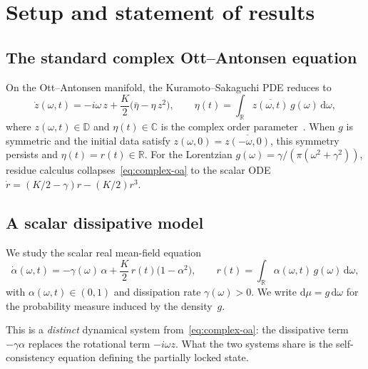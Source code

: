 \documentclass[11pt,a4paper]{article}
\theoremstyle{definition}
\newcommand{\D}{\mathbb{D}}
\newcommand{\R}{\mathbb{R}}
\newcommand{\C}{\mathbb{C}}
\begin{document}
\tableofcontents

\section{Setup and statement of results}\label{sec:setup}

\subsection{The standard complex Ott--Antonsen equation}\label{sec:complex-oa}

On the Ott--Antonsen manifold, the Kuramoto--Sakaguchi PDE reduces to
\begin{equation}\label{eq:complex-oa}
\dot{z}(\omega,t) = -i\omega\,z + \frac{K}{2}\bigl(\bar\eta - \eta\,z^2\bigr), \qquad \eta(t) = \int_\R \overline{z(\omega,t)}\,g(\omega)\,\mathrm{d}\omega,
\end{equation}
where $z(\omega,t)\in\D$ and $\eta(t)\in\C$ is the complex order parameter~\cite{ott-antonsen2008}. When $g$ is symmetric and the initial data satisfy $z(\omega,0) = \overline{z(-\omega,0)}$, this symmetry persists and $\eta(t) = r(t)\in\R$. For the Lorentzian $g(\omega) = \gamma/(\pi(\omega^2+\gamma^2))$, residue calculus collapses~\eqref{eq:complex-oa} to the scalar ODE $\dot r = (K/2-\gamma)r - (K/2)r^3$.

\subsection{A scalar dissipative model}\label{sec:scalar-model}

We study the scalar real mean-field equation
\begin{equation}\label{eq:oa}
\dot{\alpha}(\omega,t) = -\gamma(\omega)\,\alpha + \frac{K}{2}\,r(t)\bigl(1 - \alpha^2\bigr), \qquad r(t) = \int_\R \alpha(\omega,t)\,g(\omega)\,\mathrm{d}\omega,
\end{equation}
with $\alpha(\omega,t)\in(0,1)$ and dissipation rate $\gamma(\omega)>0$. We write $\mathrm{d}\mu = g\,\mathrm{d}\omega$ for the probability measure induced by the density~$g$.

This is a \emph{distinct} dynamical system from~\eqref{eq:complex-oa}: the dissipative term $-\gamma\alpha$ replaces the rotational term $-i\omega z$. What the two systems share is the self-consistency equation defining the partially locked state.
\end{document}
